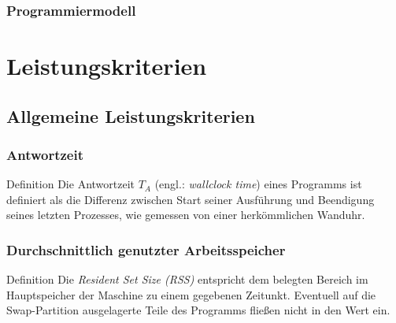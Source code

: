 \documentclass[presentation, shownotes]{beamer}
\begin{document}
\begin{frame}
\frametitle{Programmiermodell}
\end{frame}

\section{Leistungskriterien}

\begin{frame}
\tableofcontents[currentsection]
\end{frame}

\setcounter{subsection}{1}
\subsection{Allgemeine Leistungskriterien}

\begin{frame}
\frametitle{Antwortzeit}
    \begin{block}{Definition}
    Die Antwortzeit $T_A$ (engl.: \textit{wallclock time}) eines Programms ist definiert als die Differenz zwischen Start seiner Ausführung und Beendigung seines letzten Prozesses, wie gemessen von einer herkömmlichen Wanduhr.
    \end{block}
\end{frame}

\begin{frame}
\frametitle{Durchschnittlich genutzter Arbeitsspeicher}
    \begin{block}{Definition}
    Die \textit{Resident Set Size (RSS)} entspricht dem belegten Bereich im Hauptspeicher der Maschine zu einem gegebenen Zeitunkt. Eventuell auf die Swap-Partition ausgelagerte Teile des Programms fließen nicht in den Wert ein.
    \end{block}
\end{frame}
\end{document}
